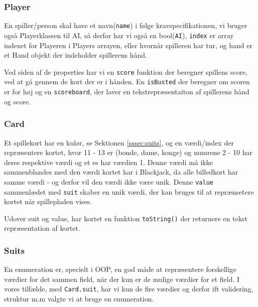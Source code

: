 \documentclass[a4paper]{article}
\begin{document}
      \subsubsection*{Player}
      En spiller/person skal have et navn(\lstinline$name$) i følge kravspecifikationen,
      vi bruger også Playerklassen til AI, så derfor har vi også en bool(\lstinline$AI$),
      \lstinline$index$ er array indexet for Playeren i Players arrayen, eller hvornår spilleren har tur,
      og hand er et Hand objekt der indeholder spillerens hånd.

      Ved siden af de properties har vi en \lstinline$score$ funktion der beregner spillens score,
      ved at gå gennem de kort der er i hånden.
      En \lstinline$isBusted$ der beregner om scoren er for høj og en \lstinline$scoreboard$,
      der laver en tekstrepræsentaiton af spillerens hånd og score.

      \subsubsection*{Card}
      Et spillekort har en kulør, se Sektionen \ref{sssec:suits}, og en værdi/index der repræsentere kortet,
      hvor 11 - 13 er (bonde, dame, konge) og numrene 2 - 10 har deres respektive værdi og et es har værdien 1.
      Denne værdi må ikke sammenblandes med den værdi kortet har i Blackjack,
      da alle billedkort har samme værdi - og derfor vil den værdi ikke være unik.
      Denne \lstinline$value$ sammenlædet med \lstinline$suit$ skaber en unik værdi,
      der kan bruges til at reprænsetere kortet når spillepladen vises.

      Udover suit og value, har kortet en funktion \lstinline$toString()$ der returnere en tekst repræsentation af kortet.
      

      \subsubsection*{Suits} \label{sssec:suits}
      En enumeration er, specielt i OOP, en god måde at repræsentere forskellige værdier for det sammen field, 
      når der kun er de mulige værdier for et field. I vores tilfælde, med \lstinline$Card.suit$,
      har vi kun de fire værdier og derfor ift validering, struktur m.m valgte vi at bruge en enumeration.
\end{document}
